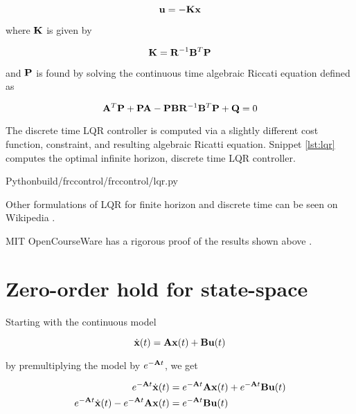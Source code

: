 \begin{equation*}
  \mathbf{u} = -\mathbf{K}\mathbf{x}
\end{equation*}

where $\mathbf{K}$ is given by

\begin{equation*}
  \mathbf{K} = \mathbf{R}^{-1}\mathbf{B}^T\mathbf{P}
\end{equation*}

and $\mathbf{P}$ is found by solving the continuous time algebraic Riccati equation
defined as

\begin{equation*}
  \mathbf{A}^T\mathbf{P} + \mathbf{P}\mathbf{A} -
    \mathbf{P}\mathbf{B}\mathbf{R}^{-1}\mathbf{B}^T\mathbf{P} + \mathbf{Q} = 0
\end{equation*}

The discrete time LQR \gls{controller} is computed via a slightly different cost
function, constraint, and resulting algebraic Ricatti equation. Snippet
\ref{lst:lqr} computes the optimal infinite horizon, discrete time LQR
\gls{controller}.

\begin{code}{Python}{build/frccontrol/frccontrol/lqr.py}
  \caption{Infinite horizon, discrete time LQR computation in Python}
  \label{lst:lqr}
\end{code}

Other formulations of LQR for finite horizon and discrete time can be seen on
Wikipedia \cite{bib:wiki_lqr}.

MIT OpenCourseWare has a rigorous proof of the results shown above
\cite{bib:lqr_derivs}.

\section{Zero-order hold for state-space}
\label{sec:deriv_zoh_ss}

Starting with the continuous \gls{model}

\begin{equation*}
  \dot{\mathbf{x}}(t) = \mathbf{A}\mathbf{x}(t) + \mathbf{B}\mathbf{u}(t)
\end{equation*}

by premultiplying the \gls{model} by $e^{-\mathbf{A}t}$, we get

\begin{align*}
  e^{-\mathbf{A}t}\dot{\mathbf{x}}(t) &= e^{-\mathbf{A}t}\mathbf{A}\mathbf{x}(t) +
    e^{-\mathbf{A}t}\mathbf{B}\mathbf{u}(t) \\
  e^{-\mathbf{A}t}\dot{\mathbf{x}}(t) - e^{-\mathbf{A}t}\mathbf{A}\mathbf{x}(t) &=
    e^{-\mathbf{A}t}\mathbf{B}\mathbf{u}(t)
\end{align*}

